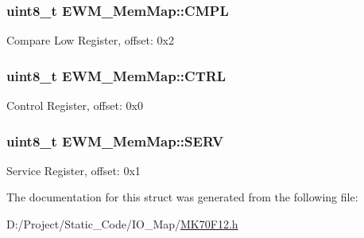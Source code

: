 \subsubsection[{C\+M\+P\+L}]{\setlength{\rightskip}{0pt plus 5cm}uint8\+\_\+t E\+W\+M\+\_\+\+Mem\+Map\+::\+C\+M\+P\+L}\label{struct_e_w_m___mem_map_ada0221f7554297f23a0257f54f28f5fc}
Compare Low Register, offset\+: 0x2 \hypertarget{struct_e_w_m___mem_map_a033a88d44ad1daa23ce3deb13bc94811}{}
\subsubsection[{C\+T\+R\+L}]{\setlength{\rightskip}{0pt plus 5cm}uint8\+\_\+t E\+W\+M\+\_\+\+Mem\+Map\+::\+C\+T\+R\+L}\label{struct_e_w_m___mem_map_a033a88d44ad1daa23ce3deb13bc94811}
Control Register, offset\+: 0x0 \hypertarget{struct_e_w_m___mem_map_aa9c25d4775f785d6911e096a226f4e40}{}
\subsubsection[{S\+E\+R\+V}]{\setlength{\rightskip}{0pt plus 5cm}uint8\+\_\+t E\+W\+M\+\_\+\+Mem\+Map\+::\+S\+E\+R\+V}\label{struct_e_w_m___mem_map_aa9c25d4775f785d6911e096a226f4e40}
Service Register, offset\+: 0x1 

The documentation for this struct was generated from the following file\+:\begin{DoxyCompactItemize}
\item 
D\+:/\+Project/\+Static\+\_\+\+Code/\+I\+O\+\_\+\+Map/\hyperlink{_m_k70_f12_8h}{M\+K70\+F12.\+h}\end{DoxyCompactItemize}
